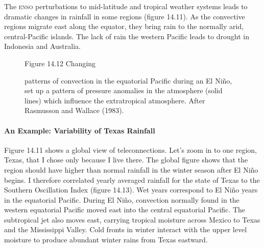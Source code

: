 The \textsc{enso} perturbations to mid-latitude and tropical weather
systems leads to dramatic changes in rainfall in some regions (figure 14.11). As the convective regions
migrate east along the equator, they bring rain to the normally arid,
central-Pacific islands. The lack of rain the western Pacific leads to
drought in Indonesia and Australia.
\begin{figure}[h!]
\vspace{-2ex}
\footnotesize
Figure 14.12 Changing \rule{0pt}{4ex}patterns of convection in the
equatorial Pacific during an El Ni\~{n}o, set up a pattern of pressure
anomalies in the atmosphere
(solid lines) which influence the extratropical atmosphere. After
Rasmusson and Wallace (1983).
\label{fig:pressureanomaly}
\vspace{-3ex}
\end{figure}

\paragraph{An Example: Variability of Texas Rainfall}
Figure 14.11 shows a global view of teleconnections. Let's zoom in to
one region, Texas, that I chose only because I live there. The global
figure shows that the region should have higher than normal rainfall
in the winter season after El Ni\~{n}o begins. I therefore correlated
yearly averaged rainfall for the state of Texas to the Southern
Oscillation Index (figure
14.13). Wet years correspond to El Ni\~{n}o years in the equatorial
Pacific. During El Ni\~{n}o, convection normally found in the western
equatorial Pacific moved east into the central equatorial Pacific. The
subtropical jet also moves east, carrying tropical moisture across
Mexico to Texas and the Mississippi Valley. Cold fronts in winter
interact with the upper level moisture to produce abundant winter
rains from Texas eastward.

